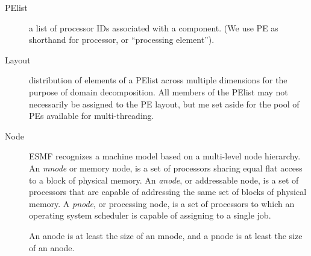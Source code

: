 
\begin{description}
\item[PElist] a list of processor IDs associated with a component. (We
  use PE as shorthand for processor, or ``processing element'').
\item[Layout] distribution of elements of a PElist across multiple
  dimensions for the purpose of domain decomposition. All members of
  the PElist may not necessarily be assigned to the PE layout, but me
  set aside for the pool of PEs available for multi-threading.
\item[Node] ESMF recognizes a machine model based on a multi-level node
  hierarchy. An \emph{mnode} or memory node, is a set of processors
  sharing equal flat access to a block of physical memory. An
  \emph{anode}, or addressable node, is a set of processors that are
  capable of addressing the same set of blocks of physical memory. A
  \emph{pnode}, or processing node, is a set of processors to which an
  operating system scheduler is capable of assigning to a single job.

  An anode is at least the size of an mnode, and a pnode is at least
  the size of an anode.
  

\end{description}
